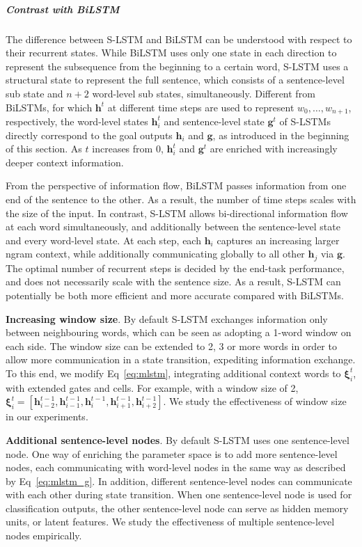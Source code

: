 \documentclass[11pt,a4paper]{article}
\begin{document}
\subparagraph{Contrast with BiLSTM}
The difference between S-LSTM and BiLSTM can be understood with respect to their recurrent states. 
While BiLSTM uses only one state in each direction to represent the subsequence from the beginning to a certain word, S-LSTM uses a structural state to represent the full sentence, which consists of a sentence-level sub state and $n+2$ word-level sub states, simultaneously.
Different from BiLSTMs, for which $\boldsymbol{h}^t$ at different time steps are used to represent $w_0, \dots, w_{n+1}$, respectively, the word-level states $\boldsymbol{h}_i^t$ and sentence-level state $\boldsymbol{g}^t$ of S-LSTMs directly correspond to the goal outputs $\boldsymbol{h}_i$ and $\boldsymbol{g}$, as introduced in the beginning of this section. 
As $t$ increases from 0, $\boldsymbol{h}_i^t$ and $\boldsymbol{g}^t$ are enriched with increasingly deeper context information. 


From the perspective of information flow, BiLSTM passes information from one end of the sentence to the other. 
As a result, the number of time steps scales with the size of the input. 
In contrast, S-LSTM allows bi-directional information flow at each word simultaneously, and additionally between the sentence-level state and every word-level state. 
At each step, each $\boldsymbol{h}_i$ captures an increasing larger ngram context, while additionally communicating globally to all other $\boldsymbol{h}_j$ via $\boldsymbol{g}$.
The optimal number of recurrent steps is decided by the end-task performance, and does not necessarily scale with the sentence size. 
As a result, S-LSTM can potentially be both more efficient and more accurate compared with BiLSTMs.


{\bf Increasing window size}. 
By default S-LSTM exchanges information only between neighbouring words, which can be seen as adopting a 1-word window on each side. 
The window size can be extended to 2, 3 or more words in order to allow more communication in a state transition, expediting information exchange. 
To this end, we modify Eq~\ref{eq:mlstm}, integrating additional context words to $\boldsymbol{\xi}_i^t$, with extended gates and cells. 
For example, with a window size of 2, $\boldsymbol{\xi}_i^t = [\boldsymbol{h}_{i-2}^{t-1}, \boldsymbol{h}_{i-1}^{t-1}, \boldsymbol{h}_{i}^{t-1}, \boldsymbol{h}_{i+1}^{t-1}, \boldsymbol{h}_{i+2}^{t-1}]$.
We study the effectiveness of window size in our experiments.


{\bf Additional sentence-level nodes}. By default S-LSTM uses one sentence-level node. 
One way of enriching the parameter space is to add more sentence-level nodes, each communicating with word-level nodes in the same way as described by Eq~\ref{eq:mlstm_g}. 
In addition, different sentence-level nodes can communicate  with each other during state transition. 
When one sentence-level node is used for classification outputs, the other sentence-level node can serve as hidden memory units, or latent features. We study the effectiveness of multiple sentence-level nodes empirically.
\end{document}

